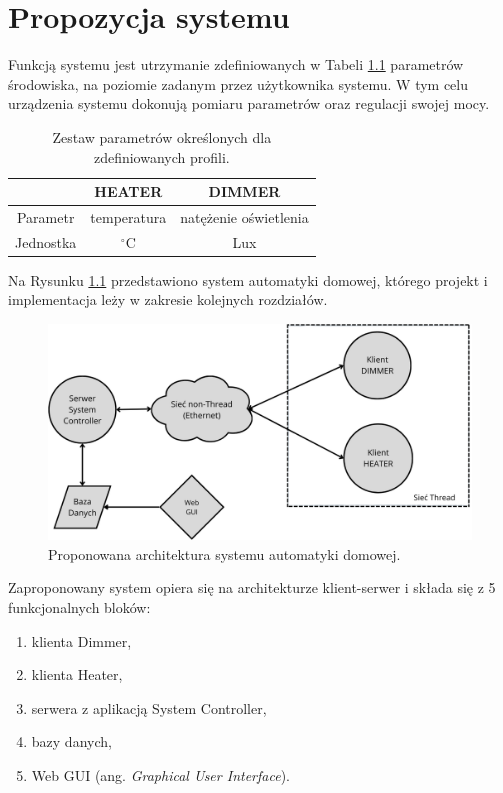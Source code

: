 \chapter{Propozycja systemu}
\label{cha:propozycja-systemu}

Funkcją systemu jest utrzymanie zdefiniowanych w Tabeli \ref{tab:profiles-parameters} parametrów środowiska, na poziomie zadanym przez użytkownika systemu. W tym celu urządzenia systemu dokonują pomiaru parametrów oraz regulacji swojej mocy.

\begin{table}[H]
    \centering
    \caption{Zestaw parametrów określonych dla zdefiniowanych profili.}
    \begin{tabular}{|c|c|c|}
         \hline
         \rowcolor{gray!20}
          & HEATER & DIMMER \\
         \hline
         \cellcolor{gray!20}Parametr & temperatura & natężenie oświetlenia \\
         \hline
         \cellcolor{gray!20}Jednostka & $^{\circ}$C & Lux \\
         \hline
    \end{tabular}
    \label{tab:profiles-parameters}
\end{table}

Na Rysunku \ref{fig:system-architecture} przedstawiono system automatyki domowej, którego projekt i implementacja leży w zakresie kolejnych rozdziałów.

\begin{figure}[H]
    \centering
    \includegraphics[width=0.8\linewidth]{graphics/system-architecture.png}
    \caption{Proponowana architektura systemu automatyki domowej.}
    \label{fig:system-architecture}
\end{figure}

Zaproponowany system opiera się na architekturze klient-serwer i składa się z 5 funkcjonalnych bloków:
\begin{enumerate}
    \item klienta Dimmer,
    \item klienta Heater,
    \item serwera z aplikacją System Controller,
    \item bazy danych,
    \item Web GUI (ang. \textit{Graphical User Interface}).
\end{enumerate}

